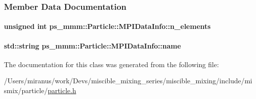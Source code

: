 \subsubsection{Member Data Documentation}
\hypertarget{classps__mmm_1_1_particle_1_1_m_p_i_data_info_aa1faf570b43888f6e600d277742e93a9}{}
\paragraph[{n\+\_\+elements}]{\setlength{\rightskip}{0pt plus 5cm}unsigned int ps\+\_\+mmm\+::\+Particle\+::\+M\+P\+I\+Data\+Info\+::n\+\_\+elements}\label{classps__mmm_1_1_particle_1_1_m_p_i_data_info_aa1faf570b43888f6e600d277742e93a9}
\hypertarget{classps__mmm_1_1_particle_1_1_m_p_i_data_info_a953480bf2236296d36f334dd24b31d40}{}
\paragraph[{name}]{\setlength{\rightskip}{0pt plus 5cm}std\+::string ps\+\_\+mmm\+::\+Particle\+::\+M\+P\+I\+Data\+Info\+::name}\label{classps__mmm_1_1_particle_1_1_m_p_i_data_info_a953480bf2236296d36f334dd24b31d40}


The documentation for this class was generated from the following file\+:\begin{DoxyCompactItemize}
\item 
/\+Users/miranus/work/\+Devs/miscible\+\_\+mixing\+\_\+series/miscible\+\_\+mixing/include/mismix/particle/\hyperlink{particle_8h}{particle.\+h}\end{DoxyCompactItemize}
